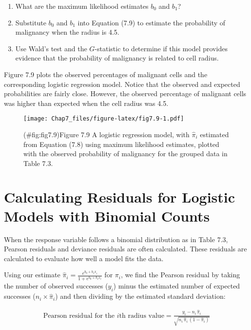 \documentclass[
]{report}
\providecommand{\tightlist}{%
  \setlength{\itemsep}{0pt}\setlength{\parskip}{0pt}}
\begin{document}
\begin{enumerate}
\def\labelenumi{\alph{enumi}.}
\tightlist
\item
  What are the maximum likelihood estimates \(b_0\) and \(b_1\)?\\
\item
  Substitute \(b_0\) and \(b_1\) into Equation (7.9) to estimate the probability of malignancy when the radius is 4.5.\\
\item
  Use Wald's test and the \(G\)-statistic to determine if this model provides evidence that the probability of malignancy is related to cell radius.
\end{enumerate}

Figure 7.9 plots the observed percentages of malignant cells and the corresponding logistic regression model.
Notice that the observed and expected probabilities are fairly close. However, the observed percentage of
malignant cells was higher than expected when the cell radius was 4.5.

\begin{figure}
\centering
\texttt{[image: Chap7\_files/figure-latex/fig7.9-1.pdf]}
\caption{(\#fig:fig7.9)Figure 7.9 A logistic regression model, with \(\hat \pi_i\) estimated from Equation (7.8) using maximum likelihood estimates, plotted with the observed probability of malignancy for the grouped data in Table 7.3.}
\end{figure}

\section{Calculating Residuals for Logistic Models with Binomial Counts}\label{calculating-residuals-for-logistic-models-with-binomial-counts}

When the response variable follows a binomial distribution as in Table 7.3, Pearson residuals and
deviance residuals are often calculated. These residuals are calculated to evaluate how well a model
fits the data.

Using our estimate \(\hat\pi_i = \frac{e^{b_0 + b_1 x_i}}{1 + e^{b_0 + b_1 x_i}}\) for \(\pi_i\), we find the Pearson residual by taking the number of observed successes (\(y_i\)) minus the estimated number of expected successes (\(n_i \times \hat\pi_i\)) and then dividing by the estimated standard deviation:

\begin{align}
\text{Pearson residual for the $i$th radius value}
= \frac{y_i - n_i \,\hat\pi_i}{\sqrt{n_i \,\hat\pi_i\,(1 - \hat\pi_i)}}
\tag{7.23}
\end{align}
\end{document}
